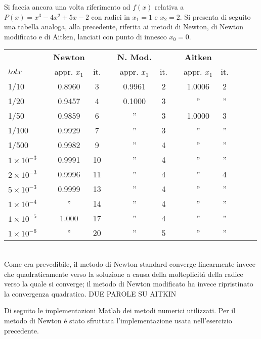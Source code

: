 \begin{center}
\footnotesize\noindent{}\end{center}

Si faccia ancora una volta riferimento ad \(f(x)\) relativa a \(P(x)=x^3 - 4x^2 + 5x - 2\) con radici in \(x_1=1\) e \(x_2=2\). Si presenta di seguito una tabella analoga, alla precedente, riferita ai metodi di Newton, di Newton modificato e di Aitken, lanciati con punto di innesco \(x_0 = 0\).\\

\begin{tabular}{l*{12}{c}}
 & \vline& \textbf{Newton} & & \vline& \textbf{N. Mod.} & & \vline& \textbf{Aitken} \\
 \(tolx\) & \vline& appr. \(x_1\) & it. & \vline& appr. \(x_1\) & it.& \vline& appr. \(x_1\) & it.\\
\hline
 1/10 & \vline& 0.8960 & 3						& \vline& 0.9961 & 2 & \vline& 1.0006 & 2 \\
 1/20 & \vline& 0.9457 & 4						& \vline& 0.1000 & 3 & \vline& ''     & ''\\
 1/50 & \vline& 0.9859 & 6						& \vline& ''     & 3 & \vline& 1.0000 & 3 \\
 1/100 & \vline& 0.9929& 7						& \vline& ''     & 3 & \vline& ''     & ''\\
 1/500 & \vline& 0.9982& 9						& \vline& ''     & 4 & \vline& ''     & ''\\
 \(1 \times 10^{-3}\) & \vline& 0.9991 & 10		& \vline& ''     & 4 & \vline& ''     & ''\\
 \(2 \times 10^{-3}\) & \vline& 0.9996 & 11		& \vline& ''     & 4 & \vline& ''     & 4\\
 \(5 \times 10^{-3}\) & \vline& 0.9999 & 13		& \vline& ''     & 4 & \vline& ''     & ''\\
 \(1 \times 10^{-4}\) & \vline& '' & 14			& \vline& ''     & 4 & \vline& ''     & ''\\
 \(1 \times 10^{-5}\) & \vline& 1.000 & 17		& \vline& ''     & 4 & \vline& ''     & ''\\
 \(1 \times 10^{-6}\) & \vline& '' & 20 		& \vline& ''     & 5 & \vline& ''     & ''\\
\end{tabular} \\

\noindent Come era prevedibile, il metodo di Newton standard converge linearmente invece che quadraticamente verso la soluzione a causa della molteplicit\'a della radice verso la quale si converge; il metodo di Newton modificato ha invece ripristinato la convergenza quadratica. DUE PAROLE SU AITKIN

\noindent Di seguito le implementazioni Matlab dei metodi numerici utilizzati. Per il metodo di Newton \'e stato sfruttata l'implementazione usata nell'esercizio precedente.


